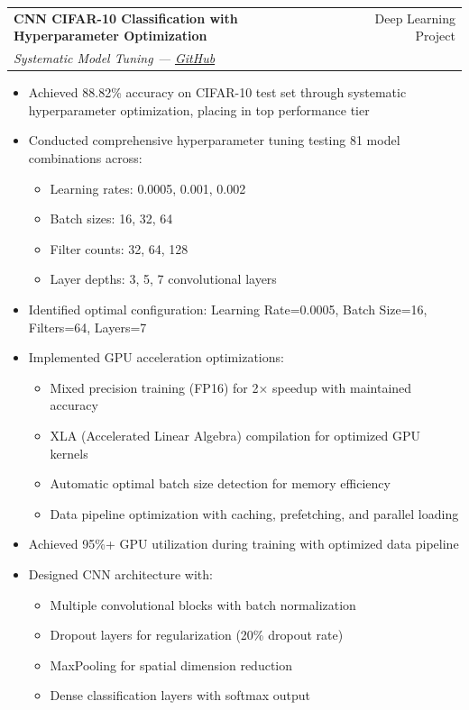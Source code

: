 \documentclass[a4paper,12pt]{article}
\makeatletter
\newenvironment{projectdetailed}[3]
    {
    \begin{tabularx}{\linewidth}{@{}l X r@{}}
    \textbf{#1} & \hfill & #2 \\
    \textit{#3} & & \\[3.75pt]
    \end{tabularx}
    \begin{minipage}[t]{\linewidth}
    \begin{itemize}[nosep,after=\strut, leftmargin=1em, itemsep=2pt,label=--]
    }
    {
    \end{itemize}
    \end{minipage}
    \vspace{6pt}
    }
\makeatother
\begin{document}
\begin{projectdetailed}{CNN CIFAR-10 Classification with Hyperparameter Optimization}{Deep Learning Project}{Systematic Model Tuning — \href{https://github.com/Umer-Farooq-CS/CNN-CIFAR10-Classification-GPU-Optimized}{GitHub}}
\item Achieved 88.82\% accuracy on CIFAR-10 test set through systematic hyperparameter optimization, placing in top performance tier
\item Conducted comprehensive hyperparameter tuning testing 81 model combinations across:
\begin{itemize}[nosep, leftmargin=2em]
    \item Learning rates: 0.0005, 0.001, 0.002
    \item Batch sizes: 16, 32, 64
    \item Filter counts: 32, 64, 128
    \item Layer depths: 3, 5, 7 convolutional layers
\end{itemize}
\item Identified optimal configuration: Learning Rate=0.0005, Batch Size=16, Filters=64, Layers=7
\item Implemented GPU acceleration optimizations:
\begin{itemize}[nosep, leftmargin=2em]
    \item Mixed precision training (FP16) for 2× speedup with maintained accuracy
    \item XLA (Accelerated Linear Algebra) compilation for optimized GPU kernels
    \item Automatic optimal batch size detection for memory efficiency
    \item Data pipeline optimization with caching, prefetching, and parallel loading
\end{itemize}
\item Achieved 95\%+ GPU utilization during training with optimized data pipeline
\item Designed CNN architecture with:
\begin{itemize}[nosep, leftmargin=2em]
    \item Multiple convolutional blocks with batch normalization
    \item Dropout layers for regularization (20\% dropout rate)
    \item MaxPooling for spatial dimension reduction
    \item Dense classification layers with softmax output
\end{itemize}

\end{projectdetailed}
\end{document}
